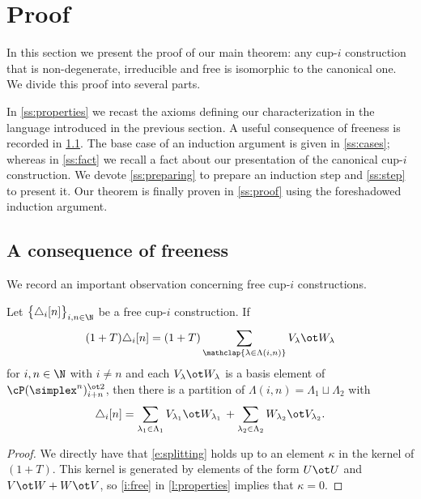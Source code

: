 
\section{Proof}\label{s:proof}

In this section we present the proof of our main theorem: any \mbox{cup-$i$} construction that is non-degenerate, irreducible and free is isomorphic to the canonical one.
We divide this proof into several parts.

In \cref{ss:properties} we recast the axioms defining our characterization in the language introduced in the previous section.
A useful consequence of freeness is recorded in \cref{ss:consequence}.
The base case of an induction argument is given in \cref{ss:cases}; whereas in
\cref{ss:fact} we recall a fact about our presentation of the canonical cup-$i$ construction.
We devote \cref{ss:preparing} to prepare an induction step and \cref{ss:step} to present it.
Our theorem is finally proven in \cref{ss:proof} using the foreshadowed induction argument.

\subsection{A consequence of freeness}\label{ss:consequence}

We record an important observation concerning free cup-$i$ constructions.

\begin{lemma}\label{l:consequence}
	Let $\big\{ \triangle_i [n] \big\}_{i,n\in\N}$ be a free \mbox{cup-$i$} construction.
	If
	\[
	(1+T) \triangle_i [n] =
	(1+T) \sum_{\mathclap{\lambda \in \Lambda(i,n)}} V_\lambda \ot W_\lambda
	\]
	for $i,n \in \N$ with $i \neq n$ and each $V_\lambda \ot W_\lambda$ is a basis element of $\cP(\simplex^n)^{\ot 2}_{i+n}$, then there is a partition of $\Lambda(i,n) = \Lambda_1 \sqcup \Lambda_2$ with
	\begin{equation}\label{e:splitting}
	\triangle_i [n] =
	\sum_{\lambda_1 \in \Lambda_1} V_{\lambda_1} \ot W_{\lambda_1} \, +
	\sum_{\lambda_2 \in \Lambda_2} W_{\lambda_2} \ot V_{\lambda_2}.
	\end{equation}
\end{lemma}

\begin{proof}
	We directly have that \eqref{e:splitting} holds up to an element $\kappa$ in the kernel of $(1+T)$.
	This kernel is generated by elements of the form $U \ot U$ and $V \ot W + W \ot V$, so \cref{i:free} in \cref{l:properties} implies that $\kappa = 0$.
\end{proof}

